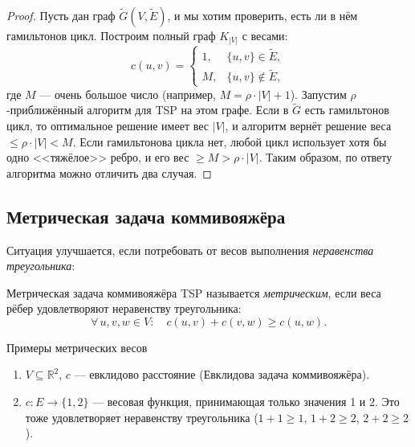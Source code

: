 \begin{proof}
Пусть дан граф $\widetilde{G}(V,\widetilde{E})$, и мы хотим проверить, есть ли в нём гамильтонов цикл. Построим полный граф $K_{|V|}$ с весами:
\[
c(u,v) = \begin{cases} 1, & \{u,v\} \in \widetilde{E}, \\ M, & \{u,v\} \notin \widetilde{E}, \end{cases}
\]
где $M$ — очень большое число (например, $M = \rho\cdot|V|+1$). Запустим $\rho$-приближённый алгоритм для TSP на этом графе. Если в $\widetilde{G}$ есть гамильтонов цикл, то оптимальное решение имеет вес $|V|$, и алгоритм вернёт решение веса $\leq \rho\cdot|V| < M$. Если гамильтонова цикла нет, любой цикл использует хотя бы одно <<тяжёлое>> ребро, и его вес $\geq M > \rho\cdot|V|$. Таким образом, по ответу алгоритма можно отличить два случая.
\end{proof}

\subsection{Метрическая задача коммивояжёра}

Ситуация улучшается, если потребовать от весов выполнения \emph{неравенства треугольника}:

\begin{Definition}{Метрическая задача коммивояжёра}{}
	TSP называется \emph{метрическим}, если веса рёбер удовлетворяют неравенству треугольника:
	\[
	\forall\, u,v,w \in V \colon\quad c(u,v) + c(v,w) \geq c(u,w).
	\]
\end{Definition}

\begin{Example}{Примеры метрических весов}{}
	\begin{enumerate}
		\item $V \subseteq \mathbb{R}^2$, $c$ — евклидово расстояние (Евклидова задача коммивояжёра).
		\item $c\colon E \to \{1,2\}$ — весовая функция, принимающая только значения 1 и 2. Это тоже удовлетворяет неравенству треугольника ($1+1 \geq 1$, $1+2 \geq 2$, $2+2 \geq 2$).
	\end{enumerate}
	
	\begin{center}
	\end{center}
\end{Example}


